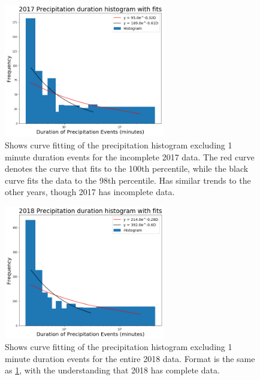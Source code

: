 \documentclass[11pt]{report}
\begin{document}
\clearpage
\begin{figure}[t]
	\centering
	\includegraphics[width=0.625\textwidth]{Figures/precip17_new.png}
	\caption[2017 precipitation duration Exponentials with contrasting curve fitting]
	{\label{precip17_redone}
		Shows curve fitting of the precipitation histogram excluding 1 minute duration events for the incomplete 2017 data. The red curve denotes the curve that fits to the 100th percentile, while the black curve fits the data to the 98th percentile. Has similar trends to the other years, though 2017 has incomplete data.   }
\end{figure}
\begin{figure}[b]
	\centering
	\includegraphics[width=0.625\textwidth]{Figures/precip18_new.png}
	\caption[2018 precipitation duration Exponentials with contrasting curve fitting]
	{\label{precip18_redone}
		Shows curve fitting of the precipitation histogram excluding 1 minute duration events for the entire 2018 data. Format is the same as \ref{precip17_redone}, with the understanding that 2018 has complete data.   }
\end{figure}

\clearpage
\end{document}
